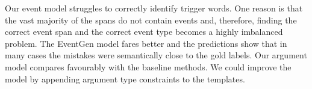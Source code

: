 \documentclass[runningheads]{llncs}
\begin{document}
Our event model struggles to correctly identify trigger words. One reason is that the vast majority of the spans do not contain events and, therefore, finding the correct event span and the correct event type becomes a highly imbalanced problem. The EventGen model fares better and the predictions show that in many cases the mistakes were semantically close to the gold labels. Our argument model compares favourably with the baseline methods. We could improve the model by appending argument type constraints to the templates.



\end{document}
